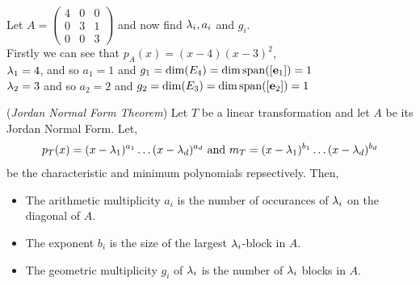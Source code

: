 \documentclass{article}
\begin{document}
\begin{eg}
  Let $\displaystyle{A = \begin{pmatrix}
    4 & 0 & 0 \\ 0 & 3 & 1 \\ 0 & 0 & 3
  \end{pmatrix}}$ and now find $\lambda_i, a_i$ and $g_i$.\\
  Firstly we can see that $p_A(x) = (x - 4)(x - 3)^2$, \\
  $\lambda_1 = 4$, and so $a_1 = 1$ and $g_1 = \dim(E_4) = \dim{\operatorname{span}([\boldsymbol{\mathbf{e}}_1])} = 1$\\
  $\lambda_2 = 3$ and so $a_2 = 2$ and $g_2 = \dim(E_3) = \dim{\operatorname{span}([\boldsymbol{\mathbf{e}}_2])} = 1$
\end{eg}

\begin{nthm}{(\textit{Jordan Normal Form Theorem})}
  Let $T$ be a linear transformation and let $A$ be its Jordan Normal Form. Let,
  $$ p_T(x) = (x - \lambda_1)^{a_1}\ldots(x - \lambda_d)^{a_d} \text{ and } m_T = (x - \lambda_1)^{b_1} \ldots (x - \lambda_d)^{b_d} $$
  be the characteristic and minimum polynomials repsectively. Then,
  \begin{itemize}
    \item The arithmetic multiplicity $a_i$ is the number of occurances of $\lambda_i$ on the diagonal of $A$.
    \item The exponent $b_i$ is the size of the largest $\lambda_i$-block in $A$.
    \item The geometric multiplicity $g_i$ of $\lambda_i$ is the number of $\lambda_i$ blocks in $A$.
  \end{itemize}
\end{nthm}
\end{document}
